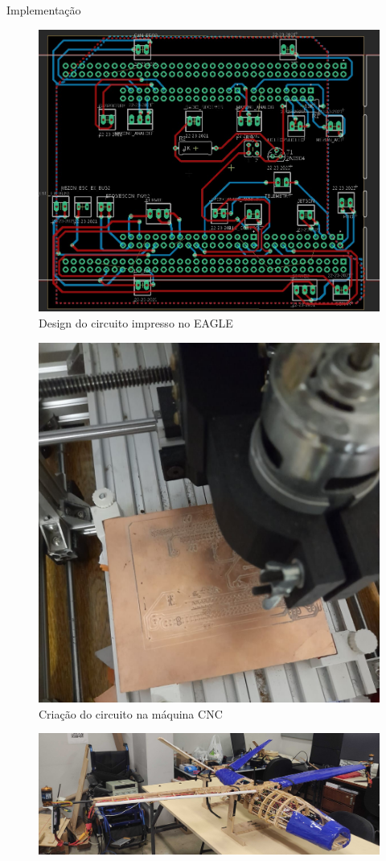 \documentclass[final,20pt]{beamer}
\newlength{\colwidth}
\begin{document}
\begin{frame}[t]
\begin{columns}[t]
\begin{column}{\colwidth}
\begin{block}{Implementação}
        \begin{minipage} {0.5\linewidth}
        \begin{figure}
            \centering
            \includegraphics[width=0.75\linewidth]{Figuras/EAGLE.jpeg}
            \caption{Design do circuito impresso no EAGLE}
            \label{fig:enter-label}
        \end{figure}
    \end{minipage}
    \begin{minipage} {0.5\linewidth}
        \begin{figure}
            \centering
            \includegraphics[width=0.58\linewidth]{Figuras/CNC.jpeg}
            \caption{Criação do circuito na máquina CNC}
            \label{fig:enter-label}
        \end{figure}
    \end{minipage}
    \begin{figure}
        \centering
        \includegraphics[width=\linewidth]{Figuras/foto-vant4.jpg}

\end{figure}
\end{block}
\end{column}
\end{columns}
\end{frame}
\end{document}
